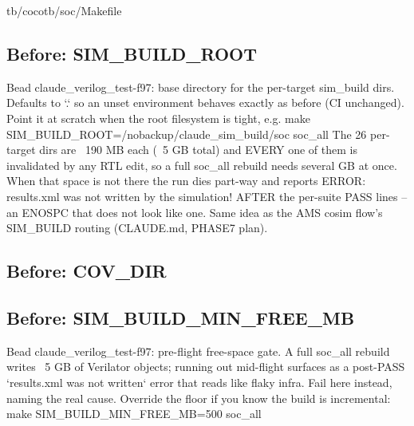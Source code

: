 \begin{relocated}{tb/cocotb/soc/Makefile}

\subsection*{Before: SIM\_BUILD\_ROOT}

\begin{textblock}
Bead claude_verilog_test-f97: base directory for the per-target sim_build dirs.
Defaults to `.` so an unset environment behaves exactly as before (CI unchanged).
Point it at scratch when the root filesystem is tight, e.g.
  make SIM_BUILD_ROOT=/nobackup/claude_sim_build/soc soc_all
The 26 per-target dirs are ~190 MB each (~5 GB total) and EVERY one of them is
invalidated by any RTL edit, so a full soc_all rebuild needs several GB at once.
When that space is not there the run dies part-way and reports
  ERROR: results.xml was not written by the simulation!
AFTER the per-suite PASS lines -- an ENOSPC that does not look like one.
Same idea as the AMS cosim flow's SIM_BUILD routing (CLAUDE.md, PHASE7 plan).
\end{textblock}

\subsection*{Before: COV\_DIR}


\subsection*{Before: SIM\_BUILD\_MIN\_FREE\_MB}

\begin{textblock}
Bead claude_verilog_test-f97: pre-flight free-space gate.  A full soc_all
rebuild writes ~5 GB of Verilator objects; running out mid-flight surfaces as
a post-PASS `results.xml was not written` error that reads like flaky infra.
Fail here instead, naming the real cause.  Override the floor if you know the
build is incremental: make SIM_BUILD_MIN_FREE_MB=500 soc_all
\end{textblock}


\end{relocated}
